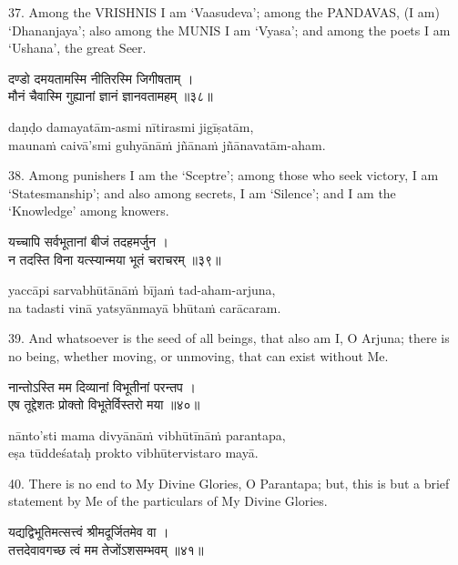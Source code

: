 37. Among the VRISHNIS I am `Vaasudeva'; among the PANDAVAS, (I am)
`Dhananjaya'; also among the MUNIS I am `Vyasa'; and among the poets I am
`Ushana', the great Seer.

\begin{gitaverse}
दण्डो दमयतामस्मि नीतिरस्मि जिगीषताम् । \\
मौनं चैवास्मि गुह्यानां ज्ञानं ज्ञानवतामहम् ॥३८॥
\end{gitaverse}

\begin{transliteration}
daṇḍo damayatām-asmi nītirasmi jigīṣatām, \\
maunaṁ caivā'smi guhyānāṁ jñānaṁ jñānavatām-aham.
\end{transliteration}

38. Among punishers I am the `Sceptre'; among those who seek victory, I am
`Statesmanship'; and also among secrets, I am `Silence'; and I am the
`Knowledge' among knowers.

\begin{gitaverse}
यच्चापि सर्वभूतानां बीजं तदहमर्जुन । \\
न तदस्ति विना यत्स्यान्मया भूतं चराचरम् ॥३९॥
\end{gitaverse}

\begin{transliteration}
yaccāpi sarvabhūtānāṁ bījaṁ tad-aham-arjuna, \\
na tadasti vinā yatsyānmayā bhūtaṁ carācaram.
\end{transliteration}

39. And whatsoever is the seed of all beings, that also am I, O Arjuna; there
is no being, whether moving, or unmoving, that can exist without Me.

\begin{gitaverse}
नान्तोऽस्ति मम दिव्यानां विभूतीनां परन्तप । \\
एष तूद्देशतः प्रोक्तो विभूतेर्विस्तरो मया ॥४०॥
\end{gitaverse}

\begin{transliteration}
nānto'sti mama divyānāṁ vibhūtīnāṁ parantapa, \\
eṣa tūddeśataḥ prokto vibhūtervistaro mayā.
\end{transliteration}

40. There is no end to My Divine Glories, O Parantapa; but, this is but a brief
statement by Me of the particulars of My Divine Glories.

\begin{gitaverse}
यद्यद्विभूतिमत्सत्त्वं श्रीमदूर्जितमेव वा । \\
तत्तदेवावगच्छ त्वं मम तेजोंऽशसम्भवम् ॥४१॥
\end{gitaverse}

